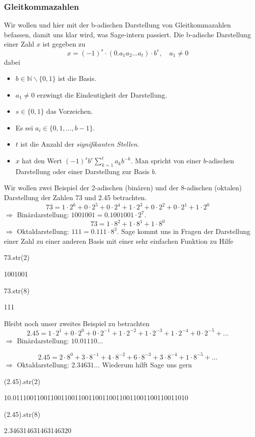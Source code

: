 \documentclass[fontsize=12pt,paper=a4,twoside,bibtotoc,idxtotoc,
liststotoc,pagesize,BCOR1.2cm,DIV15,chapterprefix,pagesize=pdftex]{scrbook}
\theoremstyle{plain}
\theoremstyle{definition}
\theoremstyle{remark}
\begin{document}
\subsubsection{Gleitkommazahlen}
Wir wollen und hier mit der b-adischen Darstellung von Gleitkommazahlen befassen, damit uns klar wird, was Sage-intern passiert. Die 
b-adische Darstellung einer Zahl $x$ ist gegeben zu
\[ x=(-1)^s \cdot (0.a_1a_2 \dots a_t) \cdot 
  b^e, \quad a_1 \neq 0
\]
dabei
\begin{itemize}
\item $b \in \mathbb{N} \smallsetminus \{ 0, 1\}$ ist die Basis.
\item $a_1 \neq 0$ erzwingt die Eindeutigkeit der Darstellung.
\item $s \in \{0, 1\}$ das Vorzeichen.
\item Es sei $a_i \in \{0,1,\dots, b-1 \}$.
\item $t$ ist die Anzahl der {\it signifikanten Stellen}.   
\item $x$ hat den Wert $(-1)^s b^e \sum_{k=1}^t a_k b^{-k}$. 
 Man spricht von einer $b$-adischen Darstellung oder einer Darstellung zur Basis $b$.
\end{itemize}
 Wir wollen zwei Beispiel der 2-adischen (binären) und der 8-adischen (oktalen) Darstellung der Zahlen 73 und 2.45 betrachten.
\[ 73 =  1 \cdot 2^6+ 0 \cdot 2^5 + 0 \cdot 2^4 +
   1 \cdot 2^3 + 0 \cdot 2^2
  +  0 \cdot 2^1 + 1 \cdot 2^0 
\]
$\Rightarrow$ Binärdarstellung: $1001001=0.1001001\cdot 2^7$.
\[
73= 1 \cdot 8^2 + 1 \cdot 8^1 + 1 \cdot 8^0
\]
 $\Rightarrow$ Oktaldarstellung: $111=0.111 \cdot 8^3$.
Sage kommt uns in Fragen der Darstellung einer Zahl zu einer anderen Basis mit einer sehr einfachen Funktion zu Hilfe
\begin{sagein}
73.str(2)
\end{sagein}
\begin{sage}
1001001
\end{sage}
\begin{sagein}
73.str(8)
\end{sagein}
\begin{sage}
111
\end{sage}
Bleibt noch unser zweites Beispiel zu betrachten
\[ 2.45 = 1 \cdot 2^1 + 0 \cdot 2^0 + 0 \cdot
  2^{-1} + 1 \cdot 2^{-2}+
 1 \cdot 2^{-3} + 1 \cdot 2^{-4}+ 0 \cdot 2^{-5}+ \dots \]
$\Rightarrow$ Binärdarstellung:  $10.01110 \dots$

\[ 2.45 = 2 \cdot 8^0 +  3 \cdot
  8^{-1} + 4 \cdot 8^{-2}+
6 \cdot 8^{-3} + 3 \cdot 8^{-4}+1 \cdot 8^{-5}+ \dots \]
$\Rightarrow$ Oktaldarstellung:  $2.34631 \dots$
Wiederum hilft Sage uns gern
 \begin{sagein}
 (2.45).str(2)
 \end{sagein}
 \begin{sage}
10.011100110011001100110011001100110011001100110011010
 \end{sage}
 \begin{sagein}
 (2.45).str(8)
 \end{sagein}
 \begin{sage}
2.346314631463146320
 \end{sage}
\end{document}
